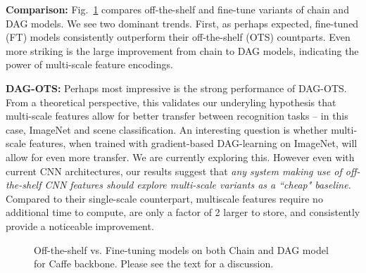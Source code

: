 \documentclass[10pt,twocolumn,letterpaper]{article}
\begin{document}
{\bf Comparison:} Fig.~\ref{fig:comp_otf} compares off-the-shelf and fine-tune variants of chain and DAG models. We see two dominant trends. First, as perhaps expected, fine-tuned (FT) models consistently outperform their off-the-shelf (OTS) countparts. Even more striking is the large improvement from chain to DAG models, indicating the power of multi-scale feature encodings.

{\bf DAG-OTS:} Perhaps most impressive is the strong performance of DAG-OTS. From a theoretical perspective, this validates our underyling hypothesis that multi-scale features allow for better transfer between recognition tasks -- in this case, ImageNet and scene classification. An interesting question is whether multi-scale features, when trained with gradient-based DAG-learning on ImageNet, will allow for even more transfer. We are currently exploring this. However even with current CNN architectures, our results suggest that {\em any system making use of off-the-shelf CNN features should explore multi-scale variants as a ``cheap" baseline.}  Compared to their single-scale counterpart, multiscale features require no additional time to compute, are only a factor of 2 larger to store, and consistently provide a noticeable improvement.


\begin{figure}[t]
\centering
	
\caption{Off-the-shelf vs. Fine-tuning models on both Chain and DAG model for Caffe backbone. Please see the text for a discussion.}
\label{fig:comp_otf}
\end{figure}
\end{document}
